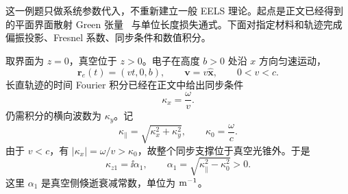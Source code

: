 
\begin{exbox}
这一例题只做系统参数代入，不重新建立一般 EELS 理论。起点是正文已经得到的平面界面散射 Green 张量~ 与单位长度损失通式。下面对指定材料和轨迹完成偏振投影、Fresnel 系数、同步条件和数值积分。

取界面为 $z=0$，真空位于 $z>0$。电子在高度 $b>0$ 处沿 $x$ 方向匀速运动，
\begin{equation*}
\mathbf r_e(t)=(vt,0,b),
\qquad
\mathbf v=v\hat{\mathbf x},
\qquad 0<v<c.
\end{equation*}
长直轨迹的时间 Fourier 积分已经在正文中给出同步条件
\begin{equation*}
\kappa_x=\frac{\omega}{v}.
\end{equation*}
仍需积分的横向波数为 $\kappa_y$。记
\begin{equation*}
\kappa_\parallel=\sqrt{\kappa_x^2+\kappa_y^2},
\qquad
\kappa_0=\frac{\omega}{c}.
\end{equation*}
由于 $v<c$，有 $|\kappa_x|=\omega/v>\kappa_0$，故整个同步支撑位于真空光锥外。于是
\begin{equation*}
\kappa_{z1}=\ii\alpha_1,
\qquad
\alpha_1=\sqrt{\kappa_\parallel^2-\kappa_0^2}>0.
\end{equation*}
这里 $\alpha_1$ 是真空侧倏逝衰减常数，单位为 ${\rm m^{-1}}$。


\end{exbox}
